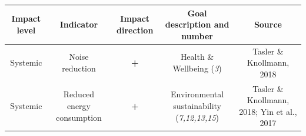 \documentclass[
]{book}
\begin{document}
\begin{longtable}[]{@{}ccccc@{}}
\toprule
\begin{minipage}[b]{0.17\columnwidth}\centering
Impact level\strut
\end{minipage} & \begin{minipage}[b]{0.16\columnwidth}\centering
Indicator\strut
\end{minipage} & \begin{minipage}[b]{0.17\columnwidth}\centering
Impact direction\strut
\end{minipage} & \begin{minipage}[b]{0.17\columnwidth}\centering
Goal description and number\strut
\end{minipage} & \begin{minipage}[b]{0.17\columnwidth}\centering
Source\strut
\end{minipage}\tabularnewline
\midrule
\endhead
\begin{minipage}[t]{0.17\columnwidth}\centering
Systemic\strut
\end{minipage} & \begin{minipage}[t]{0.16\columnwidth}\centering
Noise reduction\strut
\end{minipage} & \begin{minipage}[t]{0.17\columnwidth}\centering
\textbf{+}\strut
\end{minipage} & \begin{minipage}[t]{0.17\columnwidth}\centering
Health \& Wellbeing (\emph{3})\strut
\end{minipage} & \begin{minipage}[t]{0.17\columnwidth}\centering
Tasler \& Knollmann, 2018\strut
\end{minipage}\tabularnewline
\begin{minipage}[t]{0.17\columnwidth}\centering
Systemic\strut
\end{minipage} & \begin{minipage}[t]{0.16\columnwidth}\centering
Reduced energy consumption\strut
\end{minipage} & \begin{minipage}[t]{0.17\columnwidth}\centering
\textbf{+}\strut
\end{minipage} & \begin{minipage}[t]{0.17\columnwidth}\centering
Environmental sustainability (\emph{7,12,13,15})\strut
\end{minipage} & \begin{minipage}[t]{0.17\columnwidth}\centering
Tasler \& Knollmann, 2018; Yin et al., 2017\strut

\end{minipage}
\end{longtable}
\end{document}
